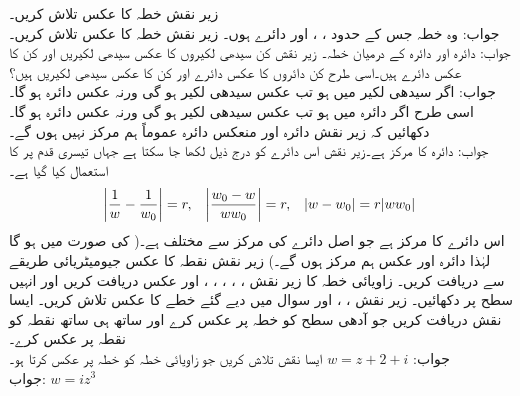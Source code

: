 \quad
زیر نقش  خطہ  کا عکس تلاش کریں۔\\
جواب:\quad
وہ خطہ جس کے حدود ، ،  اور  دائرے ہوں۔
\quad
زیر نقش  خطہ  کا عکس تلاش کریں۔\\
جواب:\quad
دائرہ  اور دائرہ  کے درمیان خطہ۔
\quad
زیر نقش  کن سیدھی لکیروں کا عکس سیدھی لکیریں اور کن کا عکس دائرے ہیں۔اسی طرح کن دائروں کا عکس دائرے اور  کن کا عکس سیدھی لکیریں ہیں؟\\
جواب:\quad
اگر سیدھی لکیر  میں  ہو تب عکس سیدھی لکیر ہو گی ورنہ عکس دائرہ ہو گا۔اسی طرح اگر دائرہ  میں  ہو تب عکس سیدھی لکیر ہو گی ورنہ عکس دائرہ ہو گا۔
\quad
دکھائیں کہ زیر نقش   دائرہ اور منعکس دائرہ عموماً  ہم مرکز نہیں ہوں گے۔\\
جواب:\quad
دائرہ  کا مرکز  ہے۔زیر نقش  اس دائرے کو درج ذیل لکھا جا سکتا ہے جہاں تیسری قدم پر
  کا استعمال کیا گیا ہے۔
\begin{align*}
\abs{\frac{1}{w}-\frac{1}{w_0}}=r,\quad \abs{\frac{w_0-w}{ww_0}}=r,\quad \abs{w-w_0}=r\abs{ww_0}
\end{align*} 
اس دائرے کا مرکز  ہے جو اصل دائرے کی مرکز  سے مختلف ہے۔( کی صورت میں  ہو گا لہٰذا دائرہ اور عکس ہم مرکز ہوں گے۔)
\quad
زیر نقش  نقطہ  کا عکس  جیومیٹریائی طریقے سے دریافت کریں۔
\quad
زاویائی  خطہ  کا زیر نقش  ، ، ، ، ،   اور  عکس دریافت کریں اور انہیں  سطح پر دکھائیں۔
\quad
زیر نقش ، ،  اور  سوال  میں دیے گئے خطے کا عکس تلاش کریں۔
\quad
ایسا نقش  دریافت کریں جو آدھی سطح  کو خطہ  پر عکس کرے اور ساتھ ہی ساتھ نقطہ  کو نقطہ  پر عکس کرے۔\\
جواب:\quad
$w=z+2+i$
\quad
ایسا نقش  تلاش کریں جو زاویائی خطہ  کو خطہ  پر عکس کرتا ہو۔\\
جواب:\quad
$w=iz^3$

